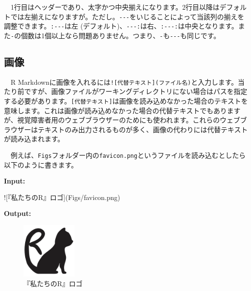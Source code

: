 \documentclass[
  a4paper,
  pandoc,
  ja=standard,
  jafont=haranoaji]{bxjsbook}
\newenvironment{Shaded}{\begin{snugshade}}{\end{snugshade}}
\newcommand{\AlertTok}[1]{\textcolor[rgb]{0.68,0.00,0.00}{#1}}
\begin{document}
　1行目はヘッダーであり、太字かつ中央揃えになります。2行目以降はデフォルトでは左揃えになりますが。ただし。\texttt{\textbar{}-\/-\/-\textbar{}}をいじることによって当該列の揃えを調整できます。\texttt{\textbar{}:-\/-\/-\textbar{}}は左
(デフォルト)、\texttt{\textbar{}-\/-\/-:\textbar{}}は右、\texttt{\textbar{}:-\/-\/-:\textbar{}}は中央となります。また\texttt{-}の個数は1個以上なら問題ありません。つまり、\texttt{\textbar{}-\textbar{}}も\texttt{\textbar{}-\/-\/-\textbar{}}も同じです。

\hypertarget{ux753bux50cf}{%
\subsection{画像}\label{ux753bux50cf}}

　R
Markdownに画像を入れるには\texttt{!{[}代替テキスト{]}(ファイル名)}と入力します。当たり前ですが、画像ファイルがワーキングディレクトリにない場合はパスを指定する必要があります。\texttt{{[}代替テキスト{]}}は画像を読み込めなかった場合のテキストを意味します。これは画像が読み込めなかった場合の代替テキストでもありますが、視覚障害者用のウェブブラウザーのためにも使われます。これらのウェブブラウザーはテキストのみ出力されるものが多く、画像の代わりには代替テキストが読み込まれます。

　例えば、\texttt{Figs}フォルダー内の\texttt{favicon.png}というファイルを読み込むとしたら以下のように書きます。

\textbf{Input:}

\begin{Shaded}
\begin{Highlighting}[]
\AlertTok{![『私たちのR』ロゴ](Figs/favicon.png)}
\end{Highlighting}
\end{Shaded}

\textbf{Output:}

\begin{figure}

{\centering \includegraphics[width=0.25\textwidth,height=\textheight]{./Figs/favicon.png}

}

\caption{『私たちのR』ロゴ}

\end{figure}
\end{document}
